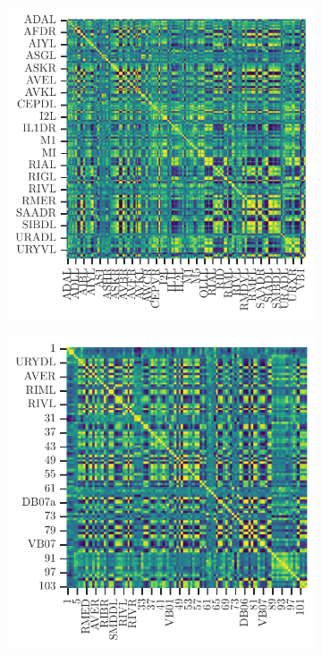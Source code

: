  \begin{figure}[h!]
\centering
 	 	\begin{subfigure}[b]{0.3\textwidth}
	\centering
	\includegraphics[width=\textwidth]{correlacion_neuropal.pdf}
	\caption{}
	\label{fig:correlacion_neuropal}
\end{subfigure}
\begin{subfigure}[b]{0.3\textwidth}
	\centering
	\includegraphics[width=\textwidth]{correlacion_kaplan.pdf}

\end{subfigure}
\end{figure}
